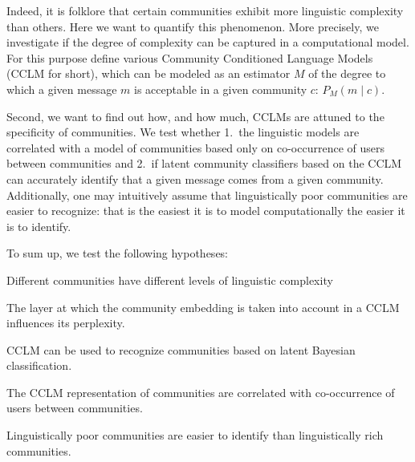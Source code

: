 \documentclass[11pt]{article}
\newcommand\jp[1]{\todo[backgroundcolor=blue!10]{JP: #1}}
\begin{document}
%
Indeed, it is folklore that certain communities exhibit more
linguistic complexity than others.  Here we want to quantify this
phenomenon.  More precisely, we investigate if the degree of
complexity can be captured in a computational model.  For this purpose
define various Community Conditioned Language Models (CCLM for short),
which can be modeled as an estimator $M$ of the degree to which a
given message $m$ is acceptable in a given community $c$:
\(P_M(m \mid c)\).

Second, we want to find out how, and how much, CCLMs are attuned to
the specificity of communities. We test whether 1.\ the linguistic
models are correlated with a model of communities based only on
co-occurrence of users between communities and 2.\ if latent community
classifiers based on the CCLM can accurately identify that a given
message comes from a given community. Additionally, one may
intuitively assume that linguistically poor communities are easier to
recognize: that is the easiest it is to model computationally
the easier it is to identify.\jp{Do we actually do this?}

To sum up, we test the following hypotheses:
\begin{hypotheses}
\item \label{hyp:varying-complexity} Different communities have different levels of linguistic
  complexity
\item \label{hyp:layer-effect} The layer at which the community embedding is taken into account
  in a CCLM influences its perplexity.
\item \label{hyp:LMCC-works} CCLM can be used to recognize communities based on
  latent Bayesian classification.
\item \label{hyp:extra-linguistic-correlation} The CCLM representation of communities are correlated with
  co-occurrence of users between communities.
\item \label{hyp:rich-harder-to-identify} Linguistically poor communities are easier to identify than
  linguistically rich communities.
\end{hypotheses}
\end{document}
